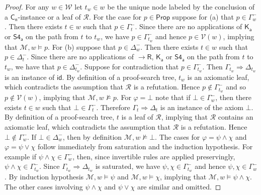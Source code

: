 \documentclass{myifcolog}
\newcommand{\K}{K}
\newcommand\Prop {\mathsf{Prop}}
\newcommand{\agi}{a}
\newcommand{\fw}{\mathcal{M}}
\newcommand{\W}{\mathcal{W}}
\newcommand{\V}{\mathcal{V}}
\numberwithin{theorem}{section}
\begin{document}
\begin{proof}
 For any $w \in \W$ let $t_w \in w$ be the unique node labeled by the conclusion of a $\mathsf{C_n}$-instance or a leaf of $\mathscr{R}$. For the case for $p \in \Prop$ suppose for (a) that $p \in \Gamma_w^-$. Then there exists $t \in w$ such that $p \in \Gamma_t^-$. Since there are no applications of $\mathsf{\K_\agi}$ or $\mathsf{S4_\agi}$ on the path from $t$ to $t_w$, we have $p \in \Gamma_{t_w}^-$ and hence $p \in \V(w)$, implying that $\fw, w \models p$. For (b) suppose that $p \in \Delta_w^-$. Then there exists $t \in w$ such that $p \in \Delta_{t}^-$. Since there are no applications of ${\rightarrow\mathsf{R}}$, $\mathsf{\K_\agi}$ or $\mathsf{S4_\agi}$ on the path from $t$ to $t_w$, we have that $p \in \Delta_{t_w}^-$. Suppose for contradiction that $p \in \Gamma_{t_w}^-$. Then $\Gamma_{t_w} \Rightarrow \Delta_{t_w}$ is an instance of $\mathsf{id}$. By definition of a proof-search tree, $t_w$ is an axiomatic leaf, which contradicts the assumption that $\mathscr{R}$ is a refutation. Hence $p \not \in \Gamma_{t_w}^-$ and so $p \not \in \V(w)$, implying that $\fw, w \not \models p$.  For $\varphi = \bot$ note that if $\bot \in \Gamma_w^-$, then there exists $t \in w$ such that $\bot \in \Gamma_t^-$. Therefore $\Gamma_t \Rightarrow \Delta_t$ is an instance of the axiom $\bot$. By definition of a proof-search tree, $t$ is a leaf of $\mathcal{R}$, implying that $\mathcal{R}$ contains an axiomatic leaf, which contradicts the assumption that $\mathcal{R}$ is a refutation. Hence $\bot \not \in \Gamma_w^-$. If $\bot \in \Delta_w^-$, then by definition $\fw, w \not \models \bot$. The cases for $\varphi = \psi \wedge \chi$ and $\varphi = \psi \vee \chi$ follow immediately from saturation and the induction hypothesis. For example if $\psi \wedge \chi \in \Gamma_w^-$, then, since invertible rules are applied preservingly, $\psi \wedge \chi \in \Gamma_{t_w}^-$. Since $\Gamma_{t_w} \Rightarrow \Delta_{t_w}$ is saturated, we have $\psi, \chi \in \Gamma_{t_w}^-$ and hence $\psi, \chi \in \Gamma_w^-$. By induction hypothesis $\fw, w \models \psi$ and $\fw, w \models \chi$, implying that $\fw, w \models \psi \wedge \chi$. The other cases involving $\psi \wedge \chi$ and $\psi \vee \chi$ are similar and omitted. \smallskip


\end{proof}
\end{document}
